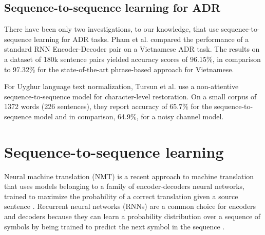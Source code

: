 \documentclass[a4paper]{article}
\begin{document}
\subsection{Sequence-to-sequence learning for ADR}

There have been only two investigations, to our knowledge, that use sequence-to-sequence learning for ADR tasks. Pham et al. \cite{pham2017use} compared the performance of a standard RNN Encoder-Decoder pair on a Vietnamese ADR task. The results on a dataset of 180k sentence pairs yielded accuracy scores of 96.15\%, in comparison to 97.32\% for the state-of-the-art phrase-based approach for Vietnamese.

For Uyghur language text normalization, Tursun et al. \cite{tursun2017noisy} use a non-attentive sequence-to-sequence model for character-level restoration. On a small corpus of 1372 words (226 sentences), they report accuracy of 65.7\% for the sequence-to-sequence model and in comparison, 64.9\%, for a noisy channel model.

\section{Sequence-to-sequence learning}

Neural machine translation (NMT) is a recent approach to machine translation that uses models belonging to a family of encoder-decoders neural networks, trained to maximize the probability of a correct translation given a source sentence \cite{sutskever2014sequence, cho2014learning}. Recurrent neural networks (RNNs) are a common choice for encoders and decoders because they can learn a probability distribution over a sequence of symbols by being trained to predict the next symbol in the sequence \cite{cho2014learning}. 
\end{document}
